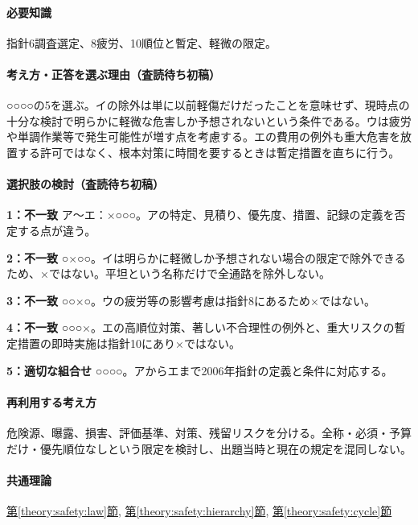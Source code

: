 \paragraph{必要知識} 指針6調査選定、8疲労、10順位と暫定、軽微の限定。

\paragraph{考え方・正答を選ぶ理由（査読待ち初稿）} ○○○○の5を選ぶ。イの除外は単に以前軽傷だけだったことを意味せず、現時点の十分な検討で明らかに軽微な危害しか予想されないという条件である。ウは疲労や単調作業等で発生可能性が増す点を考慮する。エの費用の例外も重大危害を放置する許可ではなく、根本対策に時間を要するときは暫定措置を直ちに行う。

\paragraph{選択肢の検討（査読待ち初稿）}\mbox{}\par

\noindent\textbf{1：不一致} ア〜エ：×○○○。アの特定、見積り、優先度、措置、記録の定義を否定する点が違う。\par

\noindent\textbf{2：不一致} ○×○○。イは明らかに軽微しか予想されない場合の限定で除外できるため、×ではない。平坦という名称だけで全通路を除外しない。\par

\noindent\textbf{3：不一致} ○○×○。ウの疲労等の影響考慮は指針8にあるため×ではない。\par

\noindent\textbf{4：不一致} ○○○×。エの高順位対策、著しい不合理性の例外と、重大リスクの暫定措置の即時実施は指針10にあり×ではない。\par

\noindent\textbf{5：適切な組合せ} ○○○○。アからエまで2006年指針の定義と条件に対応する。\par

\paragraph{再利用する考え方} 危険源、曝露、損害、評価基準、対策、残留リスクを分ける。全称・必須・予算だけ・優先順位なしという限定を検討し、出題当時と現在の規定を混同しない。

\paragraph{共通理論} \hyperref[theory:safety:law]{第\ref*{theory:safety:law}節}, \hyperref[theory:safety:hierarchy]{第\ref*{theory:safety:hierarchy}節}, \hyperref[theory:safety:cycle]{第\ref*{theory:safety:cycle}節}

